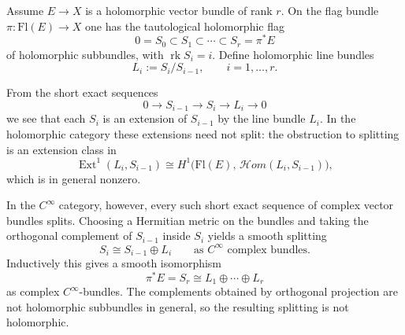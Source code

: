 \documentclass[12pt]{article}
\begin{document}
\begin{remark}
    Assume $E \to X$ is a holomorphic vector bundle of rank $r$. On the flag bundle $\pi:\mathrm{Fl}(E)\to X$ one has the tautological holomorphic flag
    \[
    0 = S_0 \subset S_1 \subset \cdots \subset S_r = \pi^{*}E
    \]
    of holomorphic subbundles, with $\operatorname{rk} S_i = i$. Define holomorphic line bundles
    \[
    L_i := S_i / S_{i-1}, \qquad i=1,\dots,r.
    \]

    From the short exact sequences
    \[
    0 \longrightarrow S_{i-1} \longrightarrow S_i \longrightarrow L_i \longrightarrow 0
    \]
    we see that each $S_i$ is an extension of $S_{i-1}$ by the line bundle $L_i$. In the holomorphic category these extensions need not split: the obstruction to splitting is an extension class in
    \[
    \operatorname{Ext}^1(L_i,S_{i-1}) \cong H^1\bigl(\mathrm{Fl}(E),\,\mathcal{H}om(L_i,S_{i-1})\bigr),
    \]
    which is in general nonzero.

    In the $C^\infty$ category, however, every such short exact sequence of complex vector bundles splits. Choosing a Hermitian metric on the bundles and taking the orthogonal complement of $S_{i-1}$ inside $S_i$ yields a smooth splitting
    \[
    S_i \cong S_{i-1} \oplus L_i
    \qquad\text{as $C^\infty$ complex bundles.}
    \]
    Inductively this gives a smooth isomorphism
    \[
    \pi^*E = S_r \cong L_1 \oplus \cdots \oplus L_r
    \]
    as complex $C^\infty$-bundles. The complements obtained by orthogonal projection are not holomorphic subbundles in general, so the resulting splitting is not holomorphic.
\end{remark}
\end{document}
